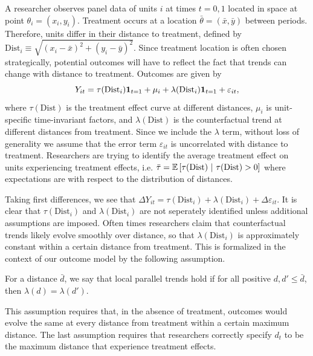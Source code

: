 \documentclass[10pt]{article}
\newcommand{\dist}{\text{Dist}}
\begin{document}
A researcher observes panel data of units $i$ at times $t = 0, 1$ located in space at point $\theta_i = (x_i, y_i)$. Treatment occurs at a location $\bar{\theta} = (\bar{x}, \bar{y})$ between periods. Therefore, units differ in their distance to treatment, defined by $\dist_i \equiv \sqrt{(x_i - \bar{x})^2 + (y_i - \bar{y})^2}$. Since treatment location is often chosen strategically, potential outcomes will have to reflect the fact that trends can change with distance to treatment. Outcomes are given by 
\[ 
    Y_{it} = \tau(\dist_i) \one_{t = 1} + \mu_i + \lambda(\dist_i) \one_{t=1} + \varepsilon_{it},    
\]
where $\tau(\dist)$ is the treatment effect curve at different distances, $\mu_i$ is unit-specific time-invariant factors, and $\lambda(\dist)$ is the counterfactual trend at different distances from treatment. Since we include the $\lambda$ term, without loss of generality we assume that the error term $\varepsilon_{it}$ is uncorrelated with distance to treatment. Researchers are trying to identify the average treatment effect on units experiencing treatment effects, i.e. $\bar{\tau} = \condexpec{\tau(\dist)}{\tau(\dist) > 0}$ where expectations are with respect to the distribution of distances.


Taking first differences, we see that $\Delta Y_{it} = \tau(\dist_i) + \lambda(\dist_i) + \Delta \varepsilon_{it}$. It is clear that $\tau(\dist_i)$ and $\lambda(\dist_i)$ are not seperately identified unless additional assumptions are imposed. Often times researchers claim that counterfactual trends likely evolve smoothly over distance, so that $\lambda(\dist_i)$ is approximately constant within a certain distance from treatment. This is formalized in the context of our outcome model by the following assumption. 

\begin{assumption}\label{assum:parallel}
    For a distance $\bar{d}$, we say that local parallel trends hold if for all positive $d, d' \leq \bar{d}$, then $\lambda(d) = \lambda(d')$.
\end{assumption}

This assumption requires that, in the absence of treatment, outcomes would evolve the same at every distance from treatment within a certain maximum distance. The last assumption requires that researchers correctly specify $d_t$ to be the maximum distance that experience treatment effects. 
\end{document}
